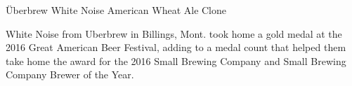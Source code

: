 \begin{recipe}{Überbrew White Noise American Wheat Ale Clone}

\begin{aboutblock}
White Noise from Uberbrew in Billings, Mont. took home a gold medal at the 2016
Great American Beer Festival, adding to a medal count that helped them take home
the award for the 2016 Small Brewing Company and Small Brewing Company Brewer of
the Year. \sourceaha
\end{aboutblock}


\begin{methodandtiming}
 
\begin{mashsteps}
\end{mashsteps}

\end{methodandtiming}

\recipebreak

\begin{ingredientsblock}

\begin{malts}
\end{malts}

\begin{hops}
\end{hops}


\end{ingredientsblock}

\end{recipe}